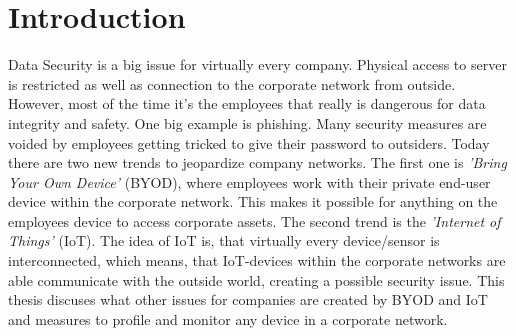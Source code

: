\chapter{Introduction}
Data Security is a big issue for virtually every company. Physical access to server is restricted as well as connection to the corporate network from outside. However, most of the time it's the employees that really is dangerous for data integrity and safety. One big example is phishing. Many security measures are voided by employees getting tricked to give their password to outsiders. Today there are two new trends to jeopardize company networks. The first one is \textit{'Bring Your Own Device'} (BYOD), where employees work with their private end-user device within the corporate network. This makes it possible for anything on the employees device to access corporate assets. The second trend is the \textit{'Internet of Things'} (IoT). The idea of IoT is, that virtually every device/sensor is interconnected, which means, that IoT-devices within the corporate networks are able communicate with the outside world, creating a possible security issue. This thesis discuses what other issues for companies are created by BYOD and IoT and measures to profile and monitor any device in a corporate network.
